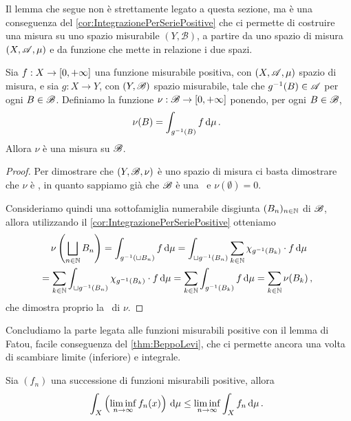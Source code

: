 Il lemma che segue non è strettamente legato a questa sezione, ma è una conseguenza del \cref{cor:IntegrazionePerSeriePositive} che ci permette di costruire una misura su uno spazio misurabile $(Y,\mathscr B)$, a partire da uno spazio di misura $(X,\mathscr A,\mu)$ e da funzione che mette in relazione i due spazi.

\begin{lemma}\label{lemma:MisuraIntegrale}
	Sia $f:X\to[0,+\infty]$ una funzione misurabile positiva, con $(X,\mathscr A,\mu)$ spazio di misura, e sia $g:X\to Y$, con $(Y,\mathscr B)$ spazio misurabile, tale che $g^{-1}(B)\in\mathscr A$ per ogni $B\in\mathscr B$. Definiamo la funzione $\nu:\mathscr B\to[0,+\infty]$ ponendo, per ogni $B\in\mathscr B$,
	\begin{equation*}
		\nu(B)=\int_{g^{-1}(B)}f\,\mathrm d\mu\, \text{. }
	\end{equation*}
	Allora $\nu$ è una misura su $\mathscr B$.
\end{lemma}
\begin{proof}
	Per dimostrare che $(Y,\mathscr B,\nu)$ è uno spazio di misura ci basta dimostrare che $\nu$ è \sigadd, in quanto sappiamo già che $\mathscr B$ è una \sigalg\ e $\nu(\emptyset)=0$.
	
	Consideriamo quindi una sottofamiglia numerabile disgiunta $(B_n)_{n\in\mathbb N}$ di $\mathscr B$, allora utilizzando il \cref{cor:IntegrazionePerSeriePositive} otteniamo
	\begin{multline*}
		\nu\left(\bigsqcup_{n\in\mathbb N}B_n\right)=\int_{g^{-1}(\sqcup B_n)}f\,\mathrm d\mu=\int_{\sqcup g^{-1}(B_n)}\sum_{k\in\mathbb N}\chi_{g^{-1}(B_k)}\cdot f\,\mathrm d\mu\\
		=\sum_{k\in\mathbb N}\int_{\sqcup g^{-1}(B_n)}\chi_{g^{-1}(B_k)}\cdot f\,\mathrm d\mu=
		\sum_{k\in\mathbb N}\int_{g^{-1}(B_k)}f\,\mathrm d\mu=\sum_{k\in\mathbb N}\nu(B_k)\, \text{, }
	\end{multline*}
	che dimostra proprio la \sigadd[ità]\ di $\nu$.
\end{proof}

Concludiamo la parte legata alle funzioni misurabili positive con il lemma di Fatou, facile conseguenza del \cref{thm:BeppoLevi}, che ci permette ancora una volta di scambiare limite (inferiore) e integrale.

\begin{lemma} \label{lemma:Fatou}
	Sia $(f_n)$ una successione di funzioni misurabili positive, allora 
	\begin{equation*}
		\int_X\left(\liminf_{n\to\infty}f_n(x)\right)\,\mathrm d\mu\le \liminf_{n\to\infty}\int_Xf_n\,\mathrm d\mu\, \text{. }
	\end{equation*}
\end{lemma}


